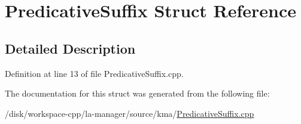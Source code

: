 \hypertarget{structPredicativeSuffix}{
\section{PredicativeSuffix Struct Reference}
\label{structPredicativeSuffix}
}


\subsection{Detailed Description}


Definition at line 13 of file PredicativeSuffix.cpp.

The documentation for this struct was generated from the following file:\begin{CompactItemize}
\item 
/disk/workspace-cpp/la-manager/source/kma/\hyperlink{PredicativeSuffix_8cpp}{PredicativeSuffix.cpp}\end{CompactItemize}

